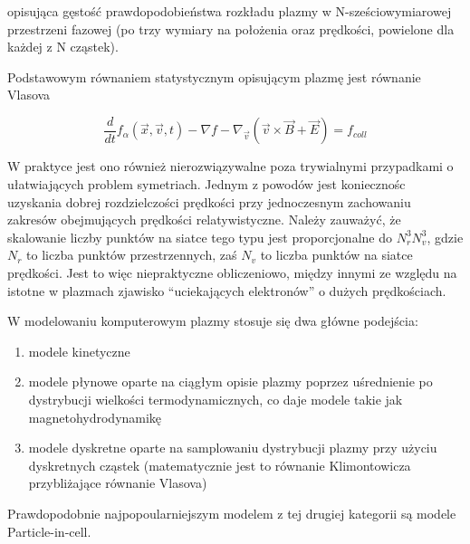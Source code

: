     opisująca gęstość prawdopodobieństwa rozkładu plazmy w N-sześciowymiarowej przestrzeni fazowej (po trzy wymiary na położenia
    oraz prędkości, powielone dla każdej z N cząstek).

    Podstawowym równaniem statystycznym opisującym plazmę jest równanie Vlasova 

    \begin{equation}
        \frac{d} {dt} f_{\alpha} (\vec{x}, \vec{v}, t) - \nabla f - \nabla_{\vec{v}} (\vec{v} \times \vec{B} + \vec{E})= f_{coll}
        \label{eqn:Vlasov}
    \end{equation}

    W praktyce jest ono również nierozwiązywalne poza trywialnymi przypadkami o ułatwiających problem symetriach.
    Jednym z powodów jest koniecznośc uzyskania dobrej rozdzielczości prędkości
    przy jednoczesnym zachowaniu zakresów obejmujących prędkości relatywistyczne. Należy zauważyć, że skalowanie
    liczby punktów na siatce tego typu jest proporcjonalne do $N_r^3 N_v^3$, gdzie $N_r$ to liczba punktów przestrzennych, zaś
    $N_v$ to liczba punktów na siatce prędkości. Jest to więc niepraktyczne
    obliczeniowo, 
    między innymi ze względu na istotne w plazmach zjawisko ``uciekających elektronów'' o dużych prędkościach.

    W modelowaniu komputerowym plazmy stosuje się dwa główne podejścia:
    \begin{enumerate}
        \item modele kinetyczne 
        \item modele płynowe oparte na ciągłym opisie plazmy poprzez uśrednienie po dystrybucji
            wielkości termodynamicznych, co daje modele takie jak magnetohydrodynamikę 
        \item modele dyskretne oparte na samplowaniu dystrybucji plazmy przy użyciu dyskretnych cząstek
            (matematycznie jest to równanie Klimontowicza przybliżające równanie Vlasova) 
    \end{enumerate}

    Prawdopodobnie najpopoularniejszym modelem z tej drugiej kategorii są modele Particle-in-cell.

